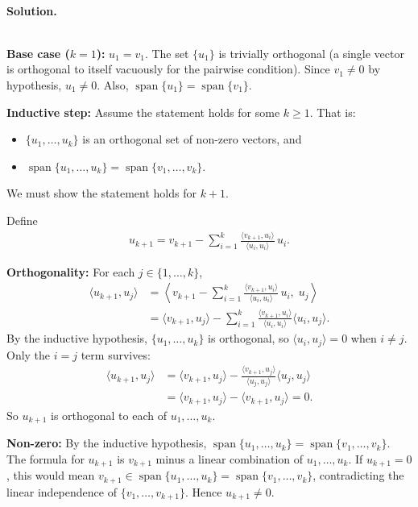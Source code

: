 \documentclass{article}
\begin{document}
\noindent\\
\textbf{Solution.}\\
\quad\\
\begin{mdframed}[linewidth=1pt]
\textbf{Base case ($k=1$):}
$u_1 = v_1$. The set $\{u_1\}$ is trivially orthogonal (a single vector is orthogonal to itself vacuously for the pairwise condition). Since $v_1 \neq 0$ by hypothesis, $u_1 \neq 0$. Also, $\operatorname{span}\{u_1\} = \operatorname{span}\{v_1\}$. 

\textbf{Inductive step:} Assume the statement holds for some $k \ge 1$. That is:
\begin{itemize}
    \item $\{u_1, \dots, u_k\}$ is an orthogonal set of non-zero vectors, and
    \item $\operatorname{span}\{u_1, \dots, u_k\} = \operatorname{span}\{v_1, \dots, v_k\}$.
\end{itemize}

We must show the statement holds for $k+1$.

Define
\begin{align*}
u_{k+1} = v_{k+1} - \sum_{i=1}^{k} \frac{\langle v_{k+1}, u_i \rangle}{\langle u_i, u_i \rangle}\, u_i.
\end{align*}

\textbf{Orthogonality:} For each $j \in \{1, \dots, k\}$,
\begin{align*}
\langle u_{k+1}, u_j \rangle
&= \left\langle v_{k+1} - \sum_{i=1}^{k} \frac{\langle v_{k+1}, u_i \rangle}{\langle u_i, u_i \rangle}\, u_i,\; u_j \right\rangle \\
&= \langle v_{k+1}, u_j \rangle - \sum_{i=1}^{k} \frac{\langle v_{k+1}, u_i \rangle}{\langle u_i, u_i \rangle} \langle u_i, u_j \rangle.
\end{align*}
By the inductive hypothesis, $\{u_1, \dots, u_k\}$ is orthogonal, so $\langle u_i, u_j \rangle = 0$ when $i \neq j$. Only the $i = j$ term survives:
\begin{align*}
\langle u_{k+1}, u_j \rangle
&= \langle v_{k+1}, u_j \rangle - \frac{\langle v_{k+1}, u_j \rangle}{\langle u_j, u_j \rangle} \langle u_j, u_j \rangle \\
&= \langle v_{k+1}, u_j \rangle - \langle v_{k+1}, u_j \rangle = 0.
\end{align*}
So $u_{k+1}$ is orthogonal to each of $u_1, \dots, u_k$.

\textbf{Non-zero:} By the inductive hypothesis, $\operatorname{span}\{u_1, \dots, u_k\} = \operatorname{span}\{v_1, \dots, v_k\}$. The formula for $u_{k+1}$ is $v_{k+1}$ minus a linear combination of $u_1, \dots, u_k$. If $u_{k+1} = 0$, this would mean $v_{k+1} \in \operatorname{span}\{u_1, \dots, u_k\} = \operatorname{span}\{v_1, \dots, v_k\}$, contradicting the linear independence of $\{v_1, \dots, v_{k+1}\}$. Hence $u_{k+1} \neq 0$.


\end{mdframed}
\end{document}

